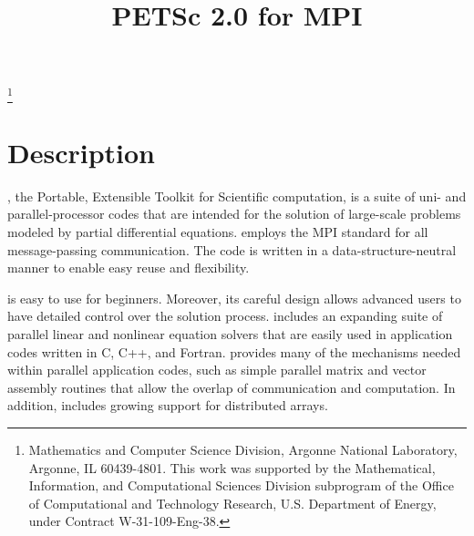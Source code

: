 \pagestyle{empty}

\pagestyle{empty}
\title{PETSc 2.0 for MPI}
\thanks{Mathematics and Computer Science Division,
Argonne National Laboratory,
Argonne, IL 60439-4801.
This work was supported by the Mathematical,
        Information, and Computational Sciences Division subprogram of
        the Office of Computational and Technology Research,
        U.S. Department of Energy, under Contract W-31-109-Eng-38.}

\date{}
\maketitle

\newcommand{\vsp}{\vspace{-1.5mm}}

\section*{Description}

, the Portable, Extensible Toolkit for Scientific computation,
is a suite of uni- and parallel-processor codes that are intended for
the solution of large-scale problems modeled by partial differential
equations.   employs the MPI standard for all
message-passing communication.  The code is written in a
data-structure-neutral manner to enable easy reuse and flexibility.

 is easy to use for beginners.  Moreover, its careful
design allows advanced users to have detailed control over the
solution process.  includes an expanding suite of parallel
linear and nonlinear equation solvers that are easily used in
application codes written in C, C++, and Fortran.  
provides many of the mechanisms needed within parallel application
codes, such as simple parallel matrix and vector assembly routines
that allow the overlap of communication and computation.  In addition,
 includes growing support for distributed arrays.

